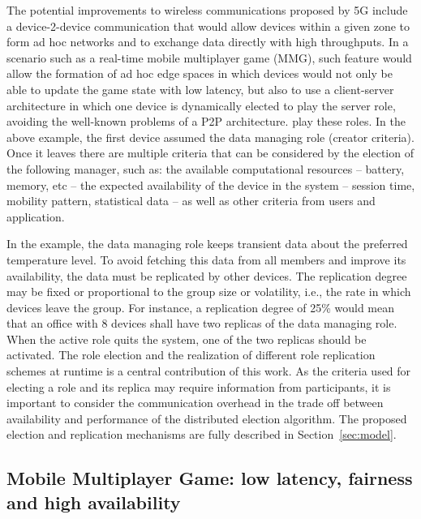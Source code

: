 The potential improvements to wireless communications proposed by 5G include a device-2-device communication that would allow devices within a given zone to form ad hoc networks and to exchange data directly with high throughputs. In a scenario such as a real-time mobile multiplayer game (MMG), such feature would allow the formation of ad hoc edge spaces in which devices would not only be able to update the game state with low latency, but also to use a client-server architecture in which one device is dynamically elected to play the server role, avoiding the well-known problems of a P2P architecture.  play these roles. In the above example, the first device assumed the data managing role (creator criteria). Once it leaves there are multiple criteria that can be considered by the election of the following manager, such as: the available computational resources -- battery, memory, etc -- the expected availability of the device in the system -- session time, mobility pattern, statistical data -- as well as other criteria from users and application. 

In the example, the data managing role keeps transient data about the preferred temperature level. To avoid fetching this data from all members and improve its availability, the data must be replicated by other devices. The replication degree may be fixed or proportional to the group size or volatility, i.e., the rate in which devices leave the group. For instance, a replication degree of 25\% would mean that an office with 8 devices shall have two replicas of the data managing role. When the active role quits the system, one of the two replicas should be activated. The role election and the realization of different role replication schemes at runtime is a central contribution of this work. As the criteria used for electing a role and its replica may require information from participants, it is important to consider the communication overhead in the trade off between availability and performance of the distributed election algorithm. The proposed election and replication mechanisms are fully described in Section~\ref{sec:model}.


\subsection{Mobile Multiplayer Game: low latency, fairness and high availability}

